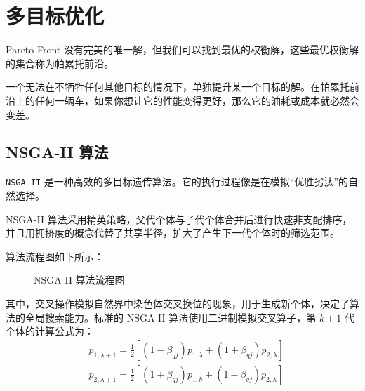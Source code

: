 \section{多目标优化}

\begin{definition}[帕累托前沿]
    Pareto Front 没有完美的唯一解，但我们可以找到最优的权衡解，这些最优权衡解的集合称为帕累托前沿。
\end{definition}

\begin{definition}[帕累托最优解]
    一个无法在不牺牲任何其他目标的情况下，单独提升某一个目标的解。在帕累托前沿上的任何一辆车，如果你想让它的性能变得更好，那么它的油耗或成本就必然会变差。
\end{definition}

\subsection{NSGA-II 算法}

\begin{definition}[NSGA-II 算法]
    \texttt{NSGA-II} 是一种高效的多目标遗传算法。它的执行过程像是在模拟“优胜劣汰”的自然选择。
\end{definition}

\begin{tips}
    NSGA-II 算法采用精英策略，父代个体与子代个体合并后进行快速非支配排序，并且用拥挤度的概念代替了共享半径，扩大了产生下一代个体时的筛选范围。
\end{tips}

算法流程图如下所示：

\begin{figure}[H]
    \centering
    \resizebox{0.8\textwidth}{!}{}
    \caption{NSGA-II 算法流程图}
    \label{fig:nsga-ii-flowchart}
\end{figure}

其中，交叉操作模拟自然界中染色体交叉换位的现象，用于生成新个体，决定了算法的全局搜索能力。标准的 NSGA-II 算法使用二进制模拟交叉算子，第 $k+1$ 代个体的计算公式为：
$$
    \begin{aligned}
         & p_{1, \lambda+1}=\frac{1}{2}\left[\left(1-\beta_{q j}\right) p_{1, \lambda}+\left(1+\beta_{q j}\right) p_{2, \lambda}\right] \\
         & p_{2, \lambda+1}=\frac{1}{2}\left[\left(1+\beta_{q j}\right) p_{1, k}+\left(1-\beta_{q j}\right) p_{2, \lambda}\right]
    \end{aligned}
$$


